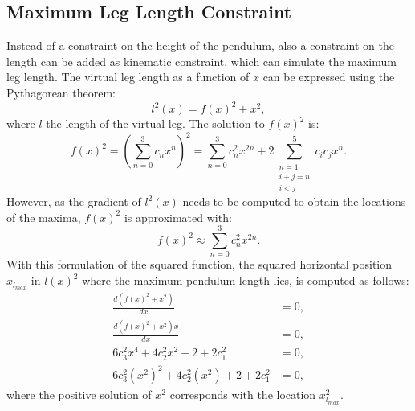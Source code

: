 \subsection{Maximum Leg Length Constraint}
Instead of a constraint on the height of the pendulum, also a constraint on the length can be added as kinematic constraint, which can simulate the maximum leg length. The virtual leg length as a function of $x$ can be expressed using the Pythagorean theorem:
\begin{equation}
	l^2(x) = f(x)^2 + x^2,
\end{equation}
where $l$ the length of the virtual leg. The solution to $f(x)^2$ is:
\begin{equation}
f(x)^2=(\sum_{n=0}^3 c_n x^n)^2 = \sum_{n=0}^3 c_n^2 x^{2n} + 2\sum_{\substack{n=1 \\ i+j=n \\ i < j}}^5 c_i c_j x^n. 
\end{equation}
However, as the gradient of $l^2(x)$ needs to be computed to obtain the locations of the maxima, $f(x)^2$ is approximated with:
\begin{equation*}
	f(x)^2\approx \sum_{n=0}^3 c_n^2 x^{2n}.
\end{equation*}
With this formulation of the squared function, the squared horizontal position $x_{l_{max}}$ in $l(x)^2$ where the maximum pendulum length lies, is computed as follows:
\begin{align}
	\frac{d(f(x)^2+x^2)}{dx}&=0,\\
	\frac{d(f(x)^2+x^2)x}{dx}&=0,\\
	6c_3^2 x^4 + 4 c_2^2 x^2 + 2+2c_1^2 &= 0,\\
	6c_3^2 (x^2)^2 + 4 c_2^2 (x^2) + 2+2c_1^2 &= 0,
\end{align}
where the positive solution of $x^2$ corresponds with the location $x_{l_{max}}^2$.


